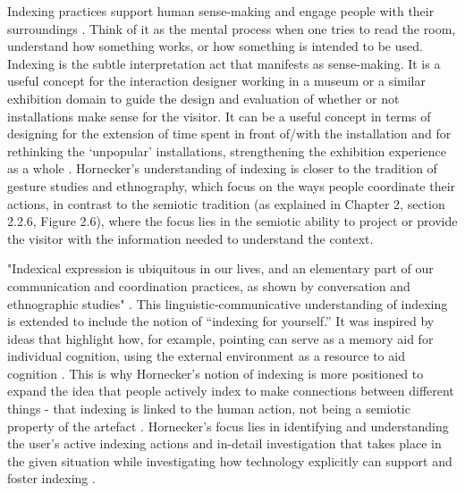 Indexing practices support human sense-making and engage people with their surroundings \autocite[p. 39]{hornecker_to-and-fro_2016}. Think of it as the mental process when one tries to read the room, understand how something works, or how something is intended to be used. Indexing is the subtle interpretation act that manifests as sense-making. It is a useful concept for the interaction designer working in a museum or a similar exhibition domain to guide the design and evaluation of whether or not installations make sense for the visitor. It can be a useful concept in terms of designing for the extension of time spent in front of/with the installation and for rethinking the ‘unpopular’ installations, strengthening the exhibition experience as a whole \autocite[p. 39]{hornecker_to-and-fro_2016}. Hornecker’s understanding of indexing is closer to the tradition of gesture studies and ethnography, which focus on the ways people coordinate their actions, in contrast to the semiotic tradition (as explained in Chapter 2, section 2.2.6, Figure 2.6), where the focus lies in the semiotic ability to project or provide the visitor with the information needed to understand the context. 

"Indexical expression is ubiquitous in our lives, and an elementary part of our communication and coordination practices, as shown by conversation and ethnographic studies" \autocite[p. 3]{hornecker_to-and-fro_2016}. This linguistic-communicative understanding of indexing is extended to include the notion of “indexing for yourself.” It was inspired by ideas that highlight how, for example, pointing can serve as a memory aid for individual cognition, using the external environment as a resource to aid cognition \autocite[p. 3]{hornecker_to-and-fro_2016}. This is why Hornecker’s notion of indexing is more positioned to expand the idea that people actively index to make connections between different things - that indexing is linked to the human action, not being a semiotic property of the artefact \autocite[p. 5]{hornecker_to-and-fro_2016}. Hornecker’s focus lies in identifying and understanding the user’s active indexing actions and in-detail investigation that takes place in the given situation while investigating how technology explicitly can support and foster indexing \autocite[p. 2]{hornecker_to-and-fro_2016}.

